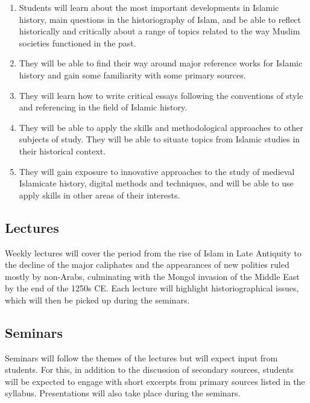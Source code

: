\documentclass[
]{book}
\providecommand{\tightlist}{%
  \setlength{\itemsep}{0pt}\setlength{\parskip}{0pt}}
\begin{document}
\begin{enumerate}
\def\labelenumi{\arabic{enumi}.}
\tightlist
\item
  Students will learn about the most important developments in Islamic history, main questions in the historiography of Islam, and be able to reflect historically and critically about a range of topics related to the way Muslim societies functioned in the past.
\item
  They will be able to find their way around major reference works for Islamic history and gain some familiarity with some primary sources.
\item
  They will learn how to write critical essays following the conventions of style and referencing in the field of Islamic history.
\item
  They will be able to apply the skills and methodological approaches to other subjects of study. They will be able to situate topics from Islamic studies in their historical context.
\item
  They will gain exposure to innovative approaches to the study of medieval Islamicate history, digital methods and techniques, and will be able to use apply skills in other areas of their interests.
\end{enumerate}

\hypertarget{lectures}{%
\subsection*{Lectures}\label{lectures}}

Weekly lectures will cover the period from the rise of Islam in Late Antiquity to the decline of the major caliphates and the appearances of new polities ruled mostly by non-Arabs, culminating with the Mongol invasion of the Middle East by the end of the 1250s CE. Each lecture will highlight historiographical issues, which will then be picked up during the seminars.

\hypertarget{seminars}{%
\subsection*{Seminars}\label{seminars}}

Seminars will follow the themes of the lectures but will expect input from students. For this, in addition to the discussion of secondary sources, students will be expected to engage with short excerpts from primary sources listed in the syllabus. Presentations will also take place during the seminars.
\end{document}
